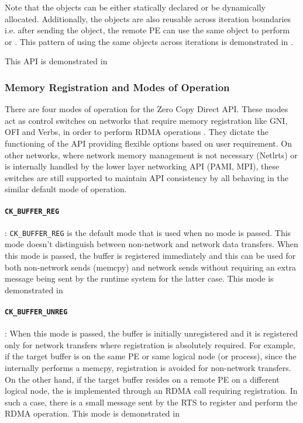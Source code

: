 Note that the  objects can be
either statically declared or be dynamically allocated.
Additionally, the objects are also reusable across iteration boundaries i.e.
after sending the  object, the remote PE can use
the same object to perform  or . This pattern
of using the same objects across iterations is demonstrated in
.

This API is demonstrated in 

\subsubsection{Memory Registration and Modes of Operation}

There are four modes of operation for the Zero Copy Direct API. These modes
act as control switches on networks that require memory registration like GNI,
OFI and Verbs, in order to perform RDMA operations . They dictate the functioning of the API
providing flexible options based on user requirement. On other networks, where
network memory management is not necessary (Netlrts) or is internally handled by the lower
layer networking API (PAMI, MPI), these switches are still supported to maintain API
consistency by all behaving in the similar default mode of operation.

\paragraph{{\tt CK\_BUFFER\_REG}}:
{\tt CK\_BUFFER\_REG} is the default mode that
is used when no mode is passed. This mode doesn't distinguish between
non-network and network data transfers. When this mode is passed, the buffer
is registered immediately and this can be used for both non-network sends (memcpy)
and network sends without requiring an extra message being sent by the runtime system
for the latter case. This mode is demonstrated in

\paragraph{{\tt CK\_BUFFER\_UNREG}}:
When this mode is passed, the buffer is initially unregistered and it is
registered only for network transfers where registration is absolutely required.
For example, if the target buffer is on the same PE or same logical node (or process),
since the  internally performs a memcpy, registration is avoided for non-network
transfers. On the other hand, if the target buffer resides on a remote PE on a different
logical node, the  is implemented through an RDMA call requiring registration.
In such a case, there is a small message sent by the RTS to register and perform
the RDMA operation. This mode is demonstrated in

